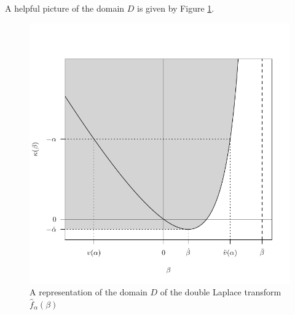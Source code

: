 \documentclass[final]{article}
\newcommand*{\1}{\mathbb{1}}
\begin{document}
A helpful picture of the domain $D$ is given by Figure \ref{f1}.
\begin{figure}[htbp]
    \centering
    \includegraphics[width=0.7\linewidth]{domain.pdf}
    \caption{A representation of the domain $D$ of the double Laplace transform
        $\hat{f}_{\alpha}(\beta)$}
    \label{f1}
\end{figure}
\end{document}
